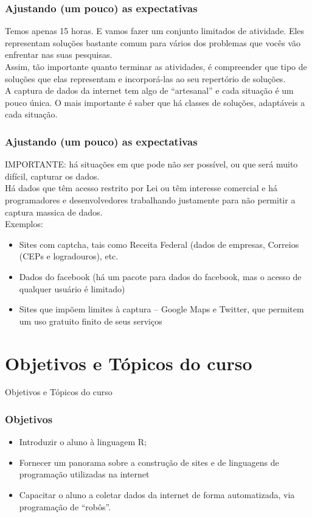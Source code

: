 \documentclass[11pt]{beamer}
\begin{document}
\begin{frame}
	\frametitle{Ajustando (um pouco) as expectativas}
	Temos apenas 15 horas. E vamos fazer um conjunto limitados de atividade. Eles representam soluções bastante comum para vários dos problemas que vocês vão enfrentar nas suas pesquisas.
	\newline\\
	Assim, tão importante quanto terminar as atividades, é compreender que tipo de soluções que elas representam e incorporá-las ao seu repertório de soluções.
	\newline\\
	A captura de dados da internet tem algo de ``artesanal'' e cada situação é um pouco única. O mais importante é saber que há classes de soluções, adaptáveis a cada situação.  
\end{frame}

\begin{frame}
	\frametitle{Ajustando (um pouco) as expectativas}
	IMPORTANTE: há situações em que pode não ser possível, ou que será muito difícil, capturar os dados.
	\newline\\
	Há dados que têm acesso restrito por Lei ou têm interesse comercial e há programadores e desenvolvedores trabalhando justamente para não permitir a captura massica de dados.
	\newline\\
	Exemplos:
	\begin{itemize}
		\item Sites com captcha, tais como Receita Federal (dados de empresas, Correios (CEPs e logradouros), etc.  
		\item Dados do facebook (há um pacote para dados do facebook, mas o acesso de qualquer usuário é limitado)
		\item Sites que impõem limites à captura -- Google Maps e Twitter, que permitem um uso gratuito finito de seus serviços  
	\end{itemize}
\end{frame}

\section{Objetivos e Tópicos do curso}
\begin{frame}
	\LARGE{Objetivos e Tópicos do curso}
\end{frame}

\begin{frame}
	\frametitle{Objetivos}
	\begin{itemize}
		\item Introduzir o aluno à linguagem R;
		\item Fornecer um panorama sobre a construção de sites e de linguagens  de programação utilizadas na internet
		\item Capacitar o aluno a coletar dados da internet de forma automatizada, via programação de “robôs”.
	\end{itemize}
\end{frame}
\end{document}
